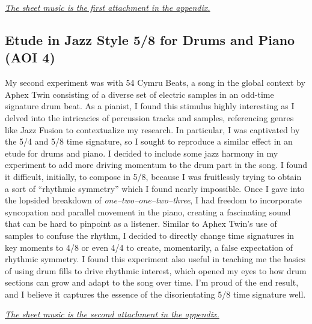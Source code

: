 \documentclass[12pt]{article}
\begin{document}
\hyperlink{page.8}{\textit{The sheet music is the first attachment in the appendix.}}

\subsection{Etude in Jazz Style 5/8 for Drums and Piano (AOI 4)}

My second experiment was with 54 Cymru Beats, a song in the global context by Aphex Twin consisting of a diverse set of electric samples in an odd-time signature drum beat. As a pianist, I found this stimulus highly interesting as I delved into the intricacies of percussion tracks and samples, referencing genres like Jazz Fusion to contextualize my research. In particular, I was captivated by the 5/4 and 5/8 time signature, so I sought to reproduce a similar effect in an etude for drums and piano. I decided to include some jazz harmony in my experiment to add more driving momentum to the drum part in the song. I found it difficult, initially, to compose in 5/8, because I was fruitlessly trying to obtain a sort of “rhythmic symmetry” which I found nearly impossible. Once I gave into the lopsided breakdown of \textit{one–two–one–two–three}, I had freedom to incorporate syncopation and parallel movement in the piano, creating a fascinating sound that can be hard to pinpoint as a listener. Similar to Aphex Twin’s use of samples to confuse the rhythm, I decided to directly change time signatures in key moments to 4/8 or even 4/4 to create, momentarily, a false expectation of rhythmic symmetry. I found this experiment also useful in teaching me the basics of using drum fills to drive rhythmic interest, which opened my eyes to how drum sections can grow and adapt to the song over time. I’m proud of the end result, and I believe it captures the essence of the disorientating 5/8 time signature well.

\hyperlink{page.18}{\textit{The sheet music is the second attachment in the appendix.}}
\end{document}
